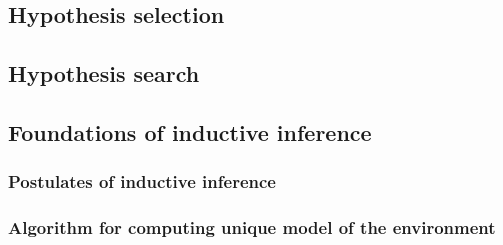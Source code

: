 \subsection{Hypothesis selection}

\subsection{Hypothesis search}

\subsection{Foundations of inductive inference}

\subsubsection{Postulates of inductive inference}
\subsubsection{Algorithm for computing unique model of the environment}

